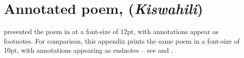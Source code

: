 \chapter{Annotated poem,  (\textit{Kiswahili})}
\renewcommand{\thesection}{D/\arabic{section}}  %
\setcounter{section}{0}  %
\label{appF}

 presented the poem in \citet{Abdulkadir2013} at a font-size of 12pt, with annotations appear as footnotes.  For comparison, this appendix prints the  same poem in a font-size of 10pt, with annotations appearing as endnotes -- see  and .


